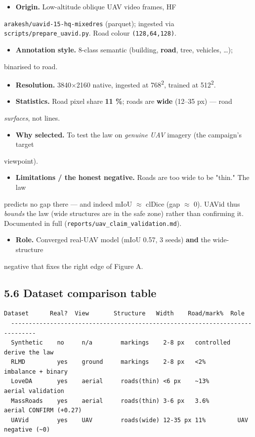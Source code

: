 \documentclass[11pt]{article}
\begin{document}
\begin{itemize}\setlength{\itemsep}{1pt}
\item \textbf{Origin.} Low-altitude oblique UAV video frames, HF
\end{itemize}
  \texttt{arakesh/uavid-15-hq-mixedres} (parquet); ingested via \texttt{scripts/prepare\_uavid.py}.   Road colour \texttt{(128,64,128)}.
\begin{itemize}\setlength{\itemsep}{1pt}
\item \textbf{Annotation style.} 8-class semantic (building, \textbf{road}, tree, vehicles, \ldots{});
\end{itemize}
  binarised to road.
\begin{itemize}\setlength{\itemsep}{1pt}
\item \textbf{Resolution.} 3840$\times$2160 native, ingested at 768\textsuperscript{2}, trained at 512\textsuperscript{2}.
\item \textbf{Statistics.} Road pixel share \textbf{11 \%}; roads are \textbf{wide} (12--35 px) --- road
\end{itemize}
  \textit{surfaces}, not lines.
\begin{itemize}\setlength{\itemsep}{1pt}
\item \textbf{Why selected.} To test the law on \textit{genuine UAV} imagery (the campaign's target
\end{itemize}
  viewpoint).
\begin{itemize}\setlength{\itemsep}{1pt}
\item \textbf{Limitations / the honest negative.} Roads are too wide to be "thin." The law
\end{itemize}
  predicts no gap there --- and indeed mIoU $\approx$ clDice (gap $\approx$ 0). UAVid thus \textit{bounds} the   law (wide structures are in the safe zone) rather than confirming it. Documented in   full (\texttt{reports/uav\_claim\_validation.md}).
\begin{itemize}\setlength{\itemsep}{1pt}
\item \textbf{Role.} Converged real-UAV model (mIoU 0.57, 3 seeds) \textbf{and} the wide-structure
\end{itemize}
  negative that fixes the right edge of Figure A.

\subsection*{5.6 Dataset comparison table}

\begin{Verbatim}[breaklines=true,breakanywhere=true,fontsize=\footnotesize]
  Dataset      Real?  View       Structure   Width    Road/mark%  Role
  -----------------------------------------------------------------------------
  Synthetic    no     n/a        markings    2-8 px   controlled  derive the law
  RLMD         yes    ground     markings    2-8 px   <2%         imbalance + binary
  LoveDA       yes    aerial     roads(thin) <6 px    ~13%        aerial validation
  MassRoads    yes    aerial     roads(thin) 3-6 px   3.6%        aerial CONFIRM (+0.27)
  UAVid        yes    UAV        roads(wide) 12-35 px 11%         UAV negative (~0)
\end{Verbatim}
\end{document}
